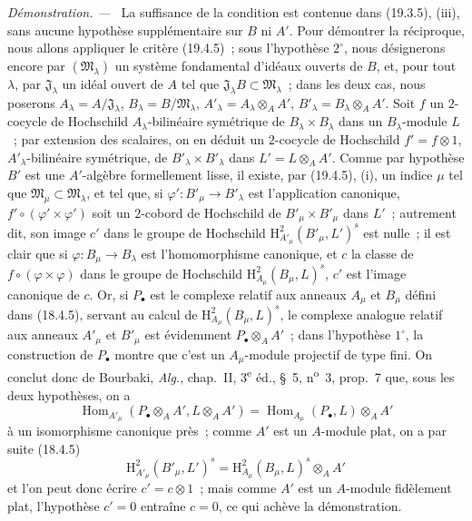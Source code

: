 \documentclass[10pt,oneside]{book}
\newenvironment{proof}{%
  \par\medskip\noindent\textit{Démonstration. ---\ }}{\par}
\begin{document}
\begin{proof}
La suffisance de la condition est contenue dans (19.3.5), (iii), sans aucune
hypothèse supplémentaire sur $B$ ni $A'$. Pour démontrer la réciproque, nous
allons appliquer le critère (19.4.5)~; sous l'hypothèse $2^\circ$, nous
désignerons encore par $(\mathfrak M_\lambda)$ un système fondamental
d'idéaux ouverts de $B$, et, pour tout $\lambda$, par
$\mathfrak J_\lambda$ un idéal ouvert de $A$ tel que
$\mathfrak J_\lambda B\subset\mathfrak M_\lambda$~; dans les deux
cas, nous poserons
$A_\lambda=A/\mathfrak J_\lambda$,
$B_\lambda=B/\mathfrak M_\lambda$,
$A'_\lambda=A_\lambda\otimes_A A'$,
$B'_\lambda=B_\lambda\otimes_A A'$. Soit $f$ un $2$-cocycle de
Hochschild $A_\lambda$-bilinéaire symétrique de
$B_\lambda\times B_\lambda$ dans un $B_\lambda$-module $L$~; par
extension des scalaires, on en déduit un $2$-cocycle de Hochschild
$f'=f\otimes1$, $A'_\lambda$-bilinéaire symétrique, de
$B'_\lambda\times B'_\lambda$ dans $L'=L\otimes_A A'$. Comme par
hypothèse $B'$ est une $A'$-algèbre formellement lisse, il existe, par (19.4.5),
(i), un indice $\mu$ tel que
$\mathfrak M_\mu\subset\mathfrak M_\lambda$, et tel que, si
$\varphi':B'_\mu\to B'_\lambda$ est l'application canonique,
$f'\circ(\varphi'\times\varphi')$ soit un $2$-cobord de Hochschild de
$B'_\mu\times B'_\mu$ dans $L'$~; autrement dit, son image $c'$ dans le
groupe de Hochschild
$\mathrm H^2_{A'_\mu}(B'_\mu,L')^s$ est nulle~; il est clair que si
$\varphi:B_\mu\to B_\lambda$ est l'homomorphisme canonique, et $c$ la
classe de $f\circ(\varphi\times\varphi)$ dans le groupe de Hochschild
$\mathrm H^2_{A_\mu}(B_\mu,L)^s$, $c'$ est l'image canonique de $c$.
Or, si $P_\bullet$ est le complexe relatif aux anneaux $A_\mu$ et
$B_\mu$ défini dans (18.4.5), servant au calcul de
$\mathrm H^2_{A_\mu}(B_\mu,L)^s$, le complexe analogue relatif aux
anneaux $A'_\mu$ et $B'_\mu$ est évidemment
$P_\bullet\otimes_A A'$~; dans l'hypothèse $1^\circ$, la construction de
$P_\bullet$ montre que c'est un $A_\mu$-module projectif de type fini.
On conclut donc de Bourbaki, \emph{Alg.}, chap.~II, 3\textsuperscript{e} éd., §~5,
n\textsuperscript{o}~3, prop.~7 que, sous les deux hypothèses, on a
\[
  \operatorname{Hom}_{A'_\mu}(P_\bullet\otimes_A A',L\otimes_A A')
  =\operatorname{Hom}_{A_\mu}(P_\bullet,L)\otimes_A A'
\]
à un isomorphisme canonique près~; comme $A'$ est un $A$-module plat, on a par
suite (18.4.5)
\[
  \mathrm H^2_{A'_\mu}(B'_\mu,L')^s
  =\mathrm H^2_{A_\mu}(B_\mu,L)^s\otimes_A A'
\]
et l'on peut donc écrire $c'=c\otimes1$~; mais comme $A'$ est un $A$-module
fidèlement plat, l'hypothèse $c'=0$ entraîne $c=0$, ce qui achève la
démonstration.
\end{proof}
\end{document}

